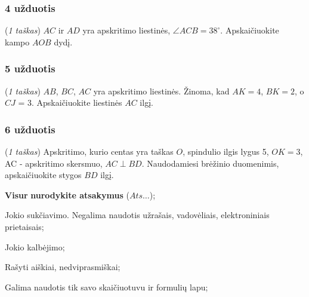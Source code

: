 \documentclass[a4paper]{article}
\begin{document}
\subsubsection*{4 užduotis}

\begin{minipage}[t]{0.25\textwidth}
      \centering
\end{minipage}\hfill
\begin{minipage}{0.69\textwidth}
      (\textit{1 taškas}) $AC$ ir $AD$ yra apskritimo liestinės, $\angle ACB =
            38^\circ$. Apskaičiuokite kampo $AOB$ dydį.
\end{minipage}

\subsubsection*{5 užduotis}

\begin{minipage}[t]{0.22\textwidth}
      \centering
\end{minipage}\hfill
\begin{minipage}{0.69\textwidth}
      (\textit{1 taškas}) $AB$, $BC$, $AC$ yra apskritimo liestinės. Žinoma,
      kad $AK=4$, $BK=2$, o $CJ$ = 3. Apskaičiuokite liestinės $AC$ ilgį.
\end{minipage}

\subsubsection*{6 užduotis}

\begin{minipage}[t]{0.22\textwidth}
      \centering
\end{minipage}\hfill
\begin{minipage}{0.69\textwidth}
      (\textit{1 taškas}) Apskritimo, kurio centas yra taškas $O$, spindulio
      ilgis lygus 5, $OK = 3$, AC - apskritimo skersmuo, $AC \perp BD$.
      Naudodamiesi
      brėžinio duomenimis, apskaičiuokite stygos $BD$ ilgį.
\end{minipage}

\vfill
\begin{small}
      \begin{enumerate*}[label={(\arabic*)}]
            \item \textbf{Visur} \textbf{nurodykite atsakymus} ($Ats\ldots$);
            \item Jokio sukčiavimo. Negalima naudotis užrašais, vadovėliais,
            elektroniniais prietaisais;
            \item Jokio kalbėjimo;
            \item Rašyti aiškiai, nedviprasmiškai;
            \item Galima naudotis tik savo skaičiuotuvu ir formulių lapu;
      \end{enumerate*}
\end{small}
\end{document}
